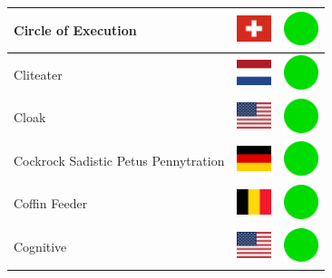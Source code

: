 \documentclass[12pt, a4paper, twoside]{report}
\begin{document}
\begin{center}
\begin{longtable}{|p{5cm}|p{2cm}|p{2cm}|}
 Circle of Execution                                        & \includegraphics[width=1cm]{../img/flags/ch} &   \includegraphics[width=1cm]{../likes/y} \\ \hline
 Cliteater                                                  & \includegraphics[width=1cm]{../img/flags/nl} &   \includegraphics[width=1cm]{../likes/y} \\ \hline
 Cloak                                                      & \includegraphics[width=1cm]{../img/flags/us} &   \includegraphics[width=1cm]{../likes/y} \\ \hline
 Cockrock Sadistic Petus Pennytration                       & \includegraphics[width=1cm]{../img/flags/de} &   \includegraphics[width=1cm]{../likes/y} \\ \hline
 Coffin Feeder                                              & \includegraphics[width=1cm]{../img/flags/be} &   \includegraphics[width=1cm]{../likes/y} \\ \hline
 Cognitive                                                  & \includegraphics[width=1cm]{../img/flags/us} &   \includegraphics[width=1cm]{../likes/y} \\ \hline

\end{longtable}
\end{center}
\end{document}
